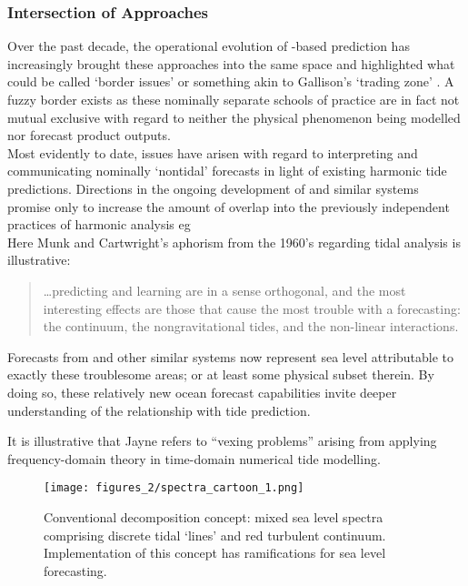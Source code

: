 \subsubsection{Intersection of Approaches}
Over the past decade, the operational evolution of \OGCM-based prediction has increasingly brought these approaches into the same space and highlighted what could be called `border issues' or something akin to Gallison's `trading zone' \citep{Galison:1996uc}.  A fuzzy border exists as these nominally separate schools of practice are in fact not mutual exclusive with regard to neither the physical phenomenon being modelled nor forecast product outputs.\\
Most evidently to date, issues have arisen with regard to interpreting and communicating nominally `nontidal' forecasts in light of existing harmonic tide predictions.   Directions in the ongoing development of \BL{} and similar systems promise only to increase the amount of overlap into the previously independent practices of harmonic analysis eg \cite{Arbic:2010us}\\
Here Munk and Cartwright's aphorism from the 1960's regarding tidal analysis is illustrative:
\begin{quote}
\dots predicting and learning are in a sense orthogonal, and the most interesting effects are those that cause the most trouble with a forecasting: the continuum, the nongravitational tides, and the non-linear interactions.\citep{Munk:1966ts} 
\end{quote}
Forecasts from \BL{} and other similar systems now represent sea level attributable to exactly these troublesome areas; or at least some physical subset therein.  By doing so, these relatively new ocean forecast capabilities invite deeper understanding of the relationship with tide prediction. 



It is illustrative that Jayne refers to ``vexing problems'' \citep[pp812]{Jayne:2001tr} arising from applying frequency-domain theory in time-domain numerical tide modelling.


\begin{figure}[h]
\begin{center}
\texttt{[image: figures\_2/spectra\_cartoon\_1.png]}
\caption{Conventional decomposition concept: mixed sea level spectra comprising discrete tidal `lines' and red turbulent continuum.  Implementation of this concept has ramifications for sea level forecasting.}
\label{fig:SPECTRA_CARTOON}
\end{center}
\end{figure}


